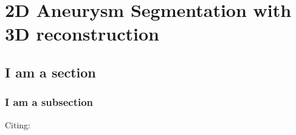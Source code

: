 \chapter{2D Aneurysm Segmentation with 3D reconstruction}



\section{I am a section}



\subsection{I am a subsection}

Citing: \cite{Sample2016}


